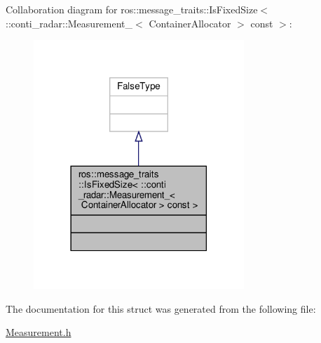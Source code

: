 Collaboration diagram for ros\+:\+:message\+\_\+traits\+:\+:Is\+Fixed\+Size$<$ \+:\+:conti\+\_\+radar\+:\+:Measurement\+\_\+$<$ Container\+Allocator $>$ const $>$\+:\nopagebreak
\begin{figure}[H]
\begin{center}
\leavevmode
\includegraphics[width=225pt]{d6/da9/structros_1_1message__traits_1_1IsFixedSize_3_01_1_1conti__radar_1_1Measurement___3_01ContainerAe9b64eeed2e223c239ba47bd2ec549ad}
\end{center}
\end{figure}


The documentation for this struct was generated from the following file\+:\begin{DoxyCompactItemize}
\item 
\hyperlink{Measurement_8h}{Measurement.\+h}\end{DoxyCompactItemize}
